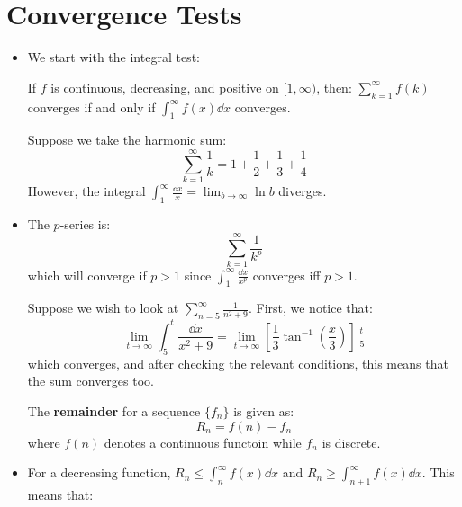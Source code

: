 \section{Convergence Tests}
\begin{itemize}
    \item We start with the integral test:
    \begin{theorem}
        If $f$ is continuous, decreasing, and positive on $[1,\infty)$, then: $\sum_{k=1}^\infty f(k)$ converges if and only if $\int_1^\infty f(x) \dd{x}$ converges.
    \end{theorem}
    \begin{example}
        Suppose we take the harmonic sum:
        \begin{equation}
            \sum_{k=1}^\infty \frac{1}{k} = 1 + \frac{1}{2} + \frac{1}{3} + \frac{1}{4}
        \end{equation}
        However, the integral $\int_1^\infty \frac{\dd{x}}{x} = \lim_{b\to\infty} \ln b$ diverges.
    \end{example}
    \item The $p$-series is:
    \begin{equation}
        \sum_{k=1}^\infty \frac{1}{k^p}
    \end{equation}
    which will converge if $p > 1$ since $\int_1^\infty \frac{\dd{x}}{x^p}$ converges iff $p>1$.
    \begin{example}
        Suppose we wish to look at $\sum_{n=5}^\infty \frac{1}{n^2+9}$. First, we notice that:
        \begin{equation}
            \lim_{t\to\infty} \int_5^t \frac{\dd{x}}{x^2+9} = \lim_{t\to\infty} \left[\frac{1}{3}\tan^{-1}\left(\frac{x}{3}\right)\right]\Biggr|^{t}_5
        \end{equation}
        which converges, and after checking the relevant conditions, this means that the sum converges too.
    \end{example}
    \begin{definition}
        The \textbf{remainder} for a sequence $\{f_n\}$ is given as:
        \begin{equation}
            R_n = f(n) - f_n
        \end{equation}
        where $f(n)$ denotes a continuous functoin while $f_n$ is discrete.
    \end{definition}
    \item For a decreasing function, $R_n \le \int_{n}^\infty f(x) \dd{x}$ and $R_n \ge \int_{n+1}^\infty f(x) \dd{x}$. This means that:

\end{itemize}
